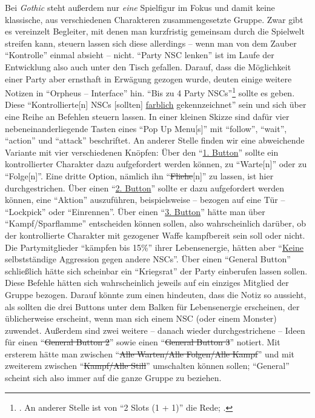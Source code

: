 \documentclass[a5paper,pagesize,numbers=noenddot]{scrbook}
\begin{document}
Bei \textit{Gothic} steht außerdem nur \textit{eine} Spielfigur im Fokus und damit keine klassische, aus verschiedenen Charakteren zusammengesetzte Gruppe.
Zwar gibt es vereinzelt Begleiter, mit denen man kurzfristig gemeinsam durch die Spielwelt streifen kann, steuern lassen sich diese allerdings -- wenn man von dem Zauber \enquote{Kontrolle} einmal absieht -- nicht. %
\enquote{Party NSC lenken} ist im Laufe der Entwicklung also auch unter den Tisch gefallen.
Darauf, dass die Möglichkeit einer Party aber ernsthaft in Erwägung gezogen wurde, deuten einige weitere Notizen in \enquote{Orpheus -- Interface} hin.
\enquote{Bis zu 4 Party NSCs}\footnote{\autocite[S.~5]{orpheus_interface}. An anderer Stelle ist von \enquote{2 Slots (1 + 1)} die Rede; \autocite[S.~7]{orpheus_b_scribbles}.} sollte es geben.
Diese \enquote{Kontrollierte[n] NSCs [sollten] \uline{farblich} gekennzeichnet}\autocite[S.~5]{orpheus_interface} sein und sich über eine Reihe an Befehlen steuern lassen.
In einer kleinen Skizze sind dafür vier nebeneinanderliegende Tasten eines \enquote{Pop Up Menu[s]} mit \enquote{follow}, \enquote{wait}, \enquote{action} und \enquote{attack} beschriftet.\autocite[S.~3]{orpheus_interface}
An anderer Stelle finden wir eine abweichende Variante mit vier verschiedenen Knöpfen:
Über den \enquote{\uline{1. Button}} sollte ein kontrollierter Charakter dazu aufgefordert werden können, zu \enquote{Warte[n]} oder zu \enquote{Folge[n]}.
Eine dritte Option, nämlich ihn \enquote{\sout{Fliehe}[n]} zu lassen, ist hier durchgestrichen.
Über einen \enquote{\uline{2. Button}} sollte er dazu aufgefordert werden können, eine \enquote{Aktion} auszuführen, beispielsweise -- bezogen auf eine Tür -- \enquote{Lockpick} oder \enquote{Einrennen}.
Über einen \enquote{\uline{3. Button}} hätte man über \enquote{Kampf/Sparflamme} entscheiden können sollen, also wahrscheinlich darüber, ob der kontrollierte Charakter mit gezogener Waffe kampfbereit sein soll oder nicht.
Die Partymitglieder \enquote{kämpfen bis 15\%} ihrer Lebensenergie, hätten aber \enquote{\uline{Keine} selbstständige Aggression gegen andere NSCs}.
Über einen \enquote{General Button} schließlich hätte sich scheinbar ein \enquote{Kriegsrat} der Party einberufen lassen sollen.
Diese Befehle hätten sich wahrscheinlich jeweils auf ein einziges Mitglied der Gruppe bezogen.
Darauf könnte zum einen hindeuten, dass die Notiz so aussieht, als sollten die drei Buttons unter dem Balken für Lebensenergie erscheinen, der üblicherweise erscheint, wenn man sich einem NSC (oder einem Monster) zuwendet.
Außerdem sind zwei weitere -- danach wieder durchgestrichene -- Ideen für einen \enquote{\sout{General Button 2}} sowie einen \enquote{\sout{General Button 3}} notiert.
Mit ersterem hätte man zwischen \enquote{\sout{Alle Warten/Alle Folgen/Alle Kampf}} und mit zweiterem zwischen \enquote{\sout{Kampf/Alle Still}} umschalten können sollen;\autocite[S.~5]{orpheus_interface} \enquote{General} scheint sich also immer auf die ganze Gruppe zu beziehen.
\end{document}
